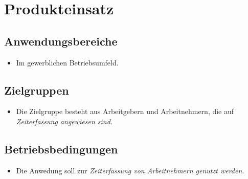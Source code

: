 \section{Produkteinsatz}

\subsection{Anwendungsbereiche}
\begin{itemize}
	\item Im gewerblichen Betriebsumfeld.
\end{itemize}

\subsection{Zielgruppen}
\begin{itemize}
	\item Die Zielgruppe besteht aus Arbeitgebern und Arbeitnehmern, die auf \em{Zeiterfassung} angewiesen sind.
\end{itemize}

\subsection{Betriebsbedingungen}
\begin{itemize}
	\item Die Anwedung soll zur \em{Zeiterfassung} von Arbeitnehmern genutzt werden.
\end{itemize}